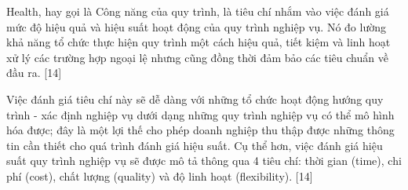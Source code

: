 Health, hay gọi là Công năng của quy trình, là tiêu chí nhắm vào việc đánh giá mức độ hiệu quả và hiệu suất hoạt động của quy trình nghiệp vụ. Nó đo lường khả năng tổ chức thực hiện quy trình một cách hiệu quả, tiết kiệm và linh hoạt xử lý các trường hợp ngoại lệ nhưng cũng đồng thời đảm bảo các tiêu chuẩn về đầu ra. [14]

Việc đánh giá tiêu chí này sẽ dễ dàng với những tổ chức hoạt động hướng quy trình - xác định nghiệp vụ dưới dạng những quy trình nghiệp vụ có thể mô hình hóa được; đây là một lợi thế cho phép doanh nghiệp thu thập được những thông tin cần thiết cho quá trình đánh giá hiệu suất. Cụ thể hơn, việc đánh giá hiệu suất quy trình nghiệp vụ sẽ được mô tả thông qua 4 tiêu chí: thời gian (time), chi phí (cost), chất lượng (quality) và độ linh hoạt (flexibility). [14]

